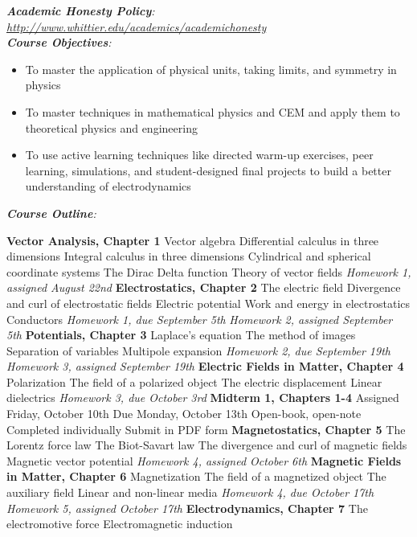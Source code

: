 \documentclass[10pt]{article}
\begin{document}
\textit{\textbf{Academic Honesty Policy}: \url{http://www.whittier.edu/academics/academichonesty}} \\
\textit{\textbf{Course Objectives}:}
\begin{itemize}
\item To master the application of physical units, taking limits, and symmetry in physics
\item To master techniques in mathematical physics and CEM and apply them to theoretical physics and engineering
\item To use active learning techniques like directed warm-up exercises, peer learning, simulations, and student-designed final projects to build a better understanding of electrodynamics
\end{itemize}
\clearpage
\twocolumn
\textit{\textbf{Course Outline}:}
\begin{outline}[enumerate]
\1 \textbf{Vector Analysis, Chapter 1}
\2 Vector algebra
\2 Differential calculus in three dimensions
\2 Integral calculus in three dimensions
\2 Cylindrical and spherical coordinate systems
\2 The Dirac Delta function
\2 Theory of vector fields
\2 \textit{Homework 1, assigned August 22nd}
\1 \textbf{Electrostatics, Chapter 2}
\2 The electric field
\2 Divergence and curl of electrostatic fields
\2 Electric potential
\2 Work and energy in electrostatics
\2 Conductors
\2 \textit{Homework 1, due September 5th}
\2 \textit{Homework 2, assigned September 5th}
\1 \textbf{Potentials, Chapter 3}
\2 Laplace's equation
\2 The method of images
\2 Separation of variables
\2 Multipole expansion
\2 \textit{Homework 2, due September 19th}
\2 \textit{Homework 3, assigned September 19th}
\1 \textbf{Electric Fields in Matter, Chapter 4}
\2 Polarization
\2 The field of a polarized object
\2 The electric displacement
\2 Linear dielectrics
\2 \textit{Homework 3, due October 3rd}
\1 \textbf{Midterm 1, Chapters 1-4}
\2 Assigned Friday, October 10th
\2 Due Monday, October 13th
\2 Open-book, open-note
\2 Completed individually
\2 Submit in PDF form
\1 \textbf{Magnetostatics, Chapter 5}
\2 The Lorentz force law
\2 The Biot-Savart law
\2 The divergence and curl of magnetic fields
\2 Magnetic vector potential
\2 \textit{Homework 4, assigned October 6th}
\1 \textbf{Magnetic Fields in Matter, Chapter 6}
\2 Magnetization
\2 The field of a magnetized object
\2 The auxiliary field
\2 Linear and non-linear media
\2 \textit{Homework 4, due October 17th}
\2 \textit{Homework 5, assigned October 17th}
\1 \textbf{Electrodynamics, Chapter 7}
\2 The electromotive force
\2 Electromagnetic induction

\end{outline}
\end{document}
